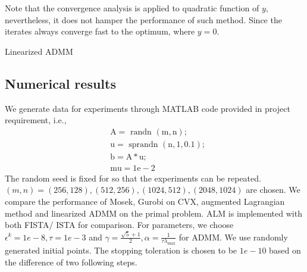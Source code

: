 \documentclass{article}
\begin{document}
Note that the convergence analysis is applied to quadratic function of $y$, nevertheless, it does not hamper the performance of such method. Since the iterates always converge fast to the optimum, where $y=0$.
\begin{algorithm}[H]
\caption{Linearized ADMM}
\begin{algorithmic}[1]\label{alg:linear admm}
\ENDWHILE
{}
\end{algorithmic}
\end{algorithm}
\subsection{Numerical results}
We generate data for experiments through MATLAB code provided in project requirement, i.e., 
$$
\begin{aligned}
	&\mathrm{A}=\text { randn }(\mathrm{m}, \mathrm{n}) ; \\
	&\mathrm{u}=\text { sprandn }(\mathrm{n}, 1,0.1) ; \\
	&\mathrm{b}=\mathrm{A} * \mathrm{u} ; \\
	&\mathrm{mu}=1 \mathrm{e}-2
\end{aligned}
$$
The random seed is fixed for so that the experiments can be repeated. $(m,n)=(256,128),(512,256),(1024,512),(2048,1024)$ are chosen. We compare the performance of Mosek, Gurobi on CVX, augmented Lagrangian method and linearized ADMM on the primal problem. ALM is implemented with both FISTA/ ISTA for comparison. For parameters, we choose $\epsilon^k=1e-8,\tau=1e-3$ and $\gamma=\frac{\sqrt{5}+1}{2},\alpha=\frac{1}{\tau\lambda_{\max}}$ for ADMM. We use randomly generated initial points. The stopping toleration is chosen to be $1e-10$ based on the difference of two following steps.
\end{document}
